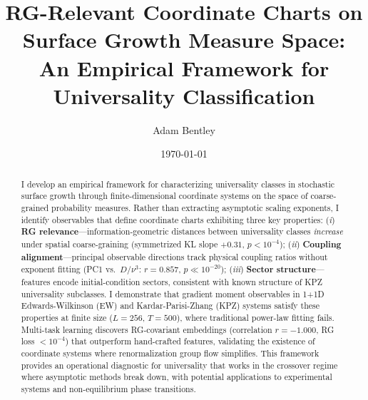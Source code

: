 \documentclass[aps,pre,reprint,amsmath,amssymb,superscriptaddress]{revtex4-2}
\begin{document}

\title{RG-Relevant Coordinate Charts on Surface Growth Measure Space:\\An Empirical Framework for Universality Classification}

\author{Adam Bentley}

\date{\today}

\begin{abstract}
I develop an empirical framework for characterizing universality classes in stochastic surface growth through finite-dimensional coordinate systems on the space of coarse-grained probability measures. Rather than extracting asymptotic scaling exponents, I identify observables that define coordinate charts exhibiting three key properties: (\textit{i}) \textbf{RG relevance}---information-geometric distances between universality classes \textit{increase} under spatial coarse-graining (symmetrized KL slope $+0.31$, $p < 10^{-4}$); (\textit{ii}) \textbf{Coupling alignment}---principal observable directions track physical coupling ratios without exponent fitting (PC1 vs.~$D/\nu^3$: $r = 0.857$, $p \ll 10^{-20}$); (\textit{iii}) \textbf{Sector structure}---features encode initial-condition sectors, consistent with known structure of KPZ universality subclasses. I demonstrate that gradient moment observables in 1+1D Edwards-Wilkinson (EW) and Kardar-Parisi-Zhang (KPZ) systems satisfy these properties at finite size ($L=256$, $T=500$), where traditional power-law fitting fails. Multi-task learning discovers RG-covariant embeddings (correlation $r=-1.000$, RG loss $<10^{-4}$) that outperform hand-crafted features, validating the existence of coordinate systems where renormalization group flow simplifies. This framework provides an operational diagnostic for universality that works in the crossover regime where asymptotic methods break down, with potential applications to experimental systems and non-equilibrium phase transitions.
\end{abstract}


\maketitle
\end{document}

